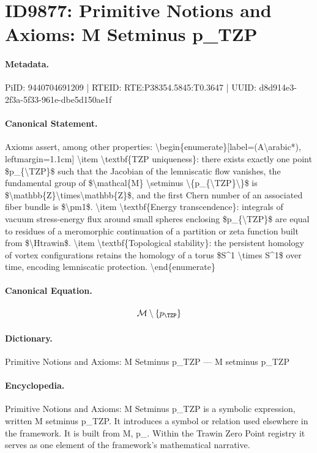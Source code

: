 \section*{ID9877: Primitive Notions and Axioms: M Setminus p\_TZP}
\paragraph{Metadata.}
PiID: 9440704691209 | RTEID: RTE:P38354.5845:T0.3647 | UUID: d8d914e3-2f3a-5f33-961e-dbe5d150ae1f

\paragraph{Canonical Statement.}
Axioms assert, among other properties: \textbackslash{}begin\{enumerate\}[label=(A\textbackslash{}arabic*), leftmargin=1.1cm] \textbackslash{}item \textbackslash{}textbf\{TZP uniqueness\}: there exists exactly one point \$p\_\{\textbackslash{}TZP\}\$ such that the Jacobian of the lemniscatic flow vanishes, the fundamental group of \$\textbackslash{}mathcal\{M\} \textbackslash{}setminus \textbackslash{}\{p\_\{\textbackslash{}TZP\}\textbackslash{}\}\$ is \$\textbackslash{}mathbb\{Z\}\textbackslash{}times\textbackslash{}mathbb\{Z\}\$, and the first Chern number of an associated fiber bundle is \$\textbackslash{}pm1\$. \textbackslash{}item \textbackslash{}textbf\{Energy transcendence\}: integrals of vacuum stress-energy flux around small spheres enclosing \$p\_\{\textbackslash{}TZP\}\$ are equal to residues of a meromorphic continuation of a partition or zeta function built from \$\textbackslash{}Htrawin\$. \textbackslash{}item \textbackslash{}textbf\{Topological stability\}: the persistent homology of vortex configurations retains the homology of a torus \$S\textasciicircum{}1 \textbackslash{}times S\textasciicircum{}1\$ over time, encoding lemniscatic protection. \textbackslash{}end\{enumerate\}

\paragraph{Canonical Equation.}
\[
\mathcal{M} \setminus \{p_{\TZP}\}
\]

\paragraph{Dictionary.}
Primitive Notions and Axioms: M Setminus p\_TZP — M setminus p\_TZP

\paragraph{Encyclopedia.}
Primitive Notions and Axioms: M Setminus p\_TZP is a symbolic expression, written M setminus p\_TZP. It introduces a symbol or relation used elsewhere in the framework. It is built from M, p\_. Within the Trawin Zero Point registry it serves as one element of the framework's mathematical narrative.
